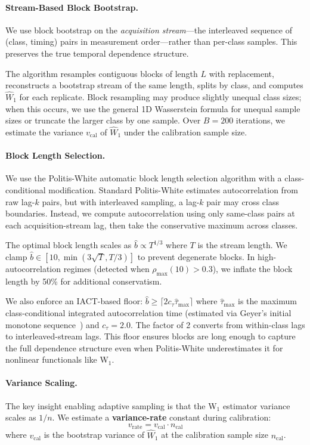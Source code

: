 \documentclass[letterpaper,twocolumn,10pt]{article}
\begin{document}
\paragraph{Stream-Based Block Bootstrap.}
We use block bootstrap on the \emph{acquisition stream}---the interleaved sequence of (class, timing)
pairs in measurement order---rather than per-class samples. This preserves the true temporal
dependence structure.

The algorithm resamples contiguous blocks of length $L$ with replacement, reconstructs a bootstrap
stream of the same length, splits by class, and computes $\widehat{W}_1$ for each replicate.
Block resampling may produce slightly unequal class sizes; when this occurs, we use the general
1D Wasserstein formula for unequal sample sizes or truncate the larger class by one sample. Over
$B = 200$ iterations, we estimate the variance $v_{\text{cal}}$ of $\widehat{W}_1$ under the
calibration sample size.

\paragraph{Block Length Selection.}
We use the Politis-White automatic block length selection algorithm with a class-conditional modification. Standard Politis-White estimates autocorrelation from raw lag-$k$ pairs, but with interleaved sampling, a lag-$k$ pair may cross class boundaries. Instead, we compute autocorrelation using only same-class pairs at each acquisition-stream lag, then take the conservative maximum across classes.

The optimal block length scales as $\hat{b} \propto T^{1/3}$ where $T$ is the stream length. We clamp $\hat{b} \in [10, \min(3\sqrt{T}, T/3)]$ to prevent degenerate blocks. In high-autocorrelation regimes (detected when $\rho_{\text{max}}(10) > 0.3$), we inflate the block length by 50\% for additional conservatism.

We also enforce an IACT-based floor: $\hat{b} \geq \lceil 2 c_\tau \hat{\tau}_{\max} \rceil$ where $\hat{\tau}_{\max}$ is the maximum class-conditional integrated autocorrelation time (estimated via Geyer's initial monotone sequence~\cite{geyer1992}) and $c_\tau = 2.0$. The factor of 2 converts from within-class lags to interleaved-stream lags. This floor ensures blocks are long enough to capture the full dependence structure even when Politis-White underestimates it for nonlinear functionals like W$_1$.

\paragraph{Variance Scaling.}
The key insight enabling adaptive sampling is that the W$_1$ estimator variance scales as $1/n$.
We estimate a \textbf{variance-rate} constant during calibration:
\begin{equation}
v_{\text{rate}} = v_{\text{cal}} \cdot n_{\text{cal}}
\end{equation}
where $v_{\text{cal}}$ is the bootstrap variance of $\widehat{W}_1$ at the calibration sample
size $n_{\text{cal}}$.
\end{document}
